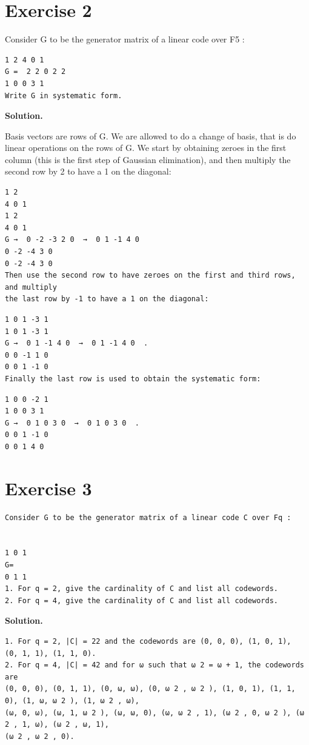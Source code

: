 \documentclass[11pt]{article}
\begin{document}
\section*{Exercise 2}
\begin{exercisebox}
Consider G to be the generator matrix of a linear code over F5 :

\begin{Verbatim}[fontsize=\small]
1 2 4 0 1
G =  2 2 0 2 2
1 0 0 3 1
Write G in systematic form.
\end{Verbatim}
\end{exercisebox}
\begin{solutionbox}
\textbf{Solution.}

Basis vectors are rows of G. We are allowed to do a change of basis, that is do linear operations on the rows of G. We start by obtaining zeroes in the first column (this is the first step of Gaussian elimination), and then multiply the second row by 2 to have a 1 on the diagonal:

\begin{Verbatim}[fontsize=\small]
1 2
4 0 1
1 2
4 0 1
G →  0 -2 -3 2 0  →  0 1 -1 4 0
0 -2 -4 3 0
0 -2 -4 3 0
Then use the second row to have zeroes on the first and third rows, and multiply
the last row by -1 to have a 1 on the diagonal:
\end{Verbatim}
\begin{Verbatim}[fontsize=\small]
1 0 1 -3 1
1 0 1 -3 1
G →  0 1 -1 4 0  →  0 1 -1 4 0  .
0 0 -1 1 0
0 0 1 -1 0
Finally the last row is used to obtain the systematic form:
\end{Verbatim}
\begin{Verbatim}[fontsize=\small]
1 0 0 -2 1
1 0 0 3 1
G →  0 1 0 3 0  →  0 1 0 3 0  .
0 0 1 -1 0
0 0 1 4 0
\end{Verbatim}
\end{solutionbox}
\section*{Exercise 3}
\begin{exercisebox}
\begin{Verbatim}[fontsize=\small]
Consider G to be the generator matrix of a linear code C over Fq :


1 0 1
G=
0 1 1
1. For q = 2, give the cardinality of C and list all codewords.
2. For q = 4, give the cardinality of C and list all codewords.
\end{Verbatim}
\end{exercisebox}
\begin{solutionbox}
\textbf{Solution.}

\begin{Verbatim}[fontsize=\small]
1. For q = 2, |C| = 22 and the codewords are (0, 0, 0), (1, 0, 1),
(0, 1, 1), (1, 1, 0).
2. For q = 4, |C| = 42 and for ω such that ω 2 = ω + 1, the codewords are
(0, 0, 0), (0, 1, 1), (0, ω, ω), (0, ω 2 , ω 2 ), (1, 0, 1), (1, 1, 0), (1, ω, ω 2 ), (1, ω 2 , ω),
(ω, 0, ω), (ω, 1, ω 2 ), (ω, ω, 0), (ω, ω 2 , 1), (ω 2 , 0, ω 2 ), (ω 2 , 1, ω), (ω 2 , ω, 1),
(ω 2 , ω 2 , 0).
\end{Verbatim}
\end{solutionbox}
\end{document}
